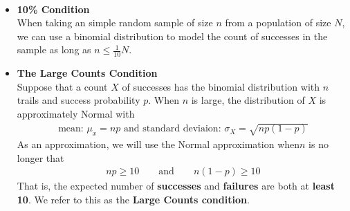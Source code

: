 \documentclass[Main.tex]{subfiles}
\begin{document}
	\begin{example} \hfill \\
		\begin{itemize}	
			\item \textbf{10\% Condition} \hfill \\
			When taking an simple random sample of size $n$ from a population of size $N$, we can use a binomial distribution to model the count of successes in the sample as long as $n\leq\frac{1}{10}N$.\hfill \\
			\item \textbf{The Large Counts Condition}\hfill \\
			Suppose that a count $X$ of successes has the binomial distribution with $n$ trails and success probability $p$. When $n$ is large, the distribution of $X$ is approximately Normal with\hfill 
				\begin{subequations}
					\begin{align}
						\text{mean: $\mu_{x}=np$ and standard deviaion: $\sigma_{X}=\sqrt{np(1-p)}$}
					\end{align}
				\end{subequations}
			As an approximation, we will use the Normal approximation when$n$ is no longer that
				\begin{subequations}
					\begin{align}
					np\geq 10\qquad\text{and}\qquad n(1-p)\geq 10
					\end{align}
				\end{subequations}
			That is, the expected number of \textbf{successes} and \textbf{failures} are both at \textbf{least 10}. We refer to this as the \textbf{Large Counts condition}.					
		\end{itemize}
	\end{example}
	
\end{document}
